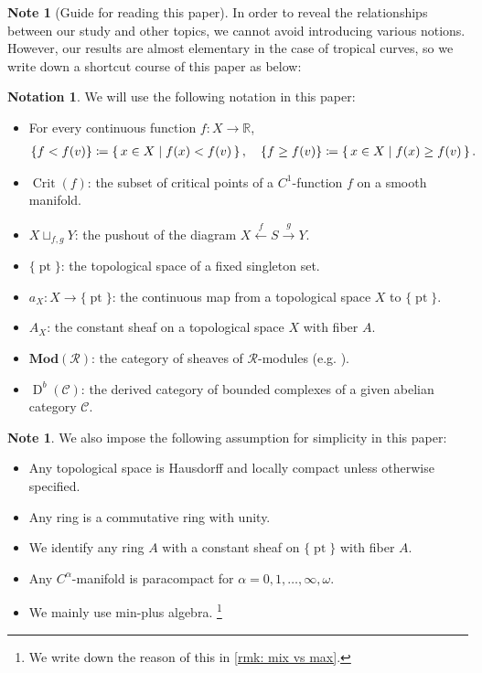 \documentclass[a4paper,dvipdfmx,reqno,12pt]{amsart}
\theoremstyle{definition}
\newtheorem{Note}[Thm]{Note}
\newtheorem{Not}[Thm]{Notation}
\newcommand{\deq}{\coloneqq}
\newcommand{\R}{\mathbb{R}}%
\newcommand{\opn}[1]{\operatorname{#1}}
\newcommand{\catn}[1]{\mathbf{#1}}
\newcommand{\xto}[1]{\xrightarrow{#1}}
\newcommand{\xgets}[1]{\xleftarrow{#1}}
\newcommand{\myfootnote}[1]{\hspace{-5pt}\footnote{#1}}
\numberwithin{equation}{section}
\begin{document}
\begin{Note}[Guide for reading this paper]
  In order to reveal the relationships between our study
  and other topics, we cannot avoid introducing various
  notions. However, our results are almost elementary
in the case of tropical curves,
  so we write down a shortcut course of this paper as below:
\end{Note}

\begin{Not}

We will use the following notation in this paper:

\begin{itemize}
\item For every continuous function $f\colon X\to \R$,
\begin{align*}
\{f<f(v)\}\deq \set{x\in X\mid f(x)< f(v)},\quad
\{f\geq f(v)\}\deq \set{x\in X\mid f(x)\geq f(v)}.
\end{align*}
\item $\opn{Crit}(f)$: the subset of critical points of
a $C^{1}$-function $f$ on a smooth manifold.
\item   $X\sqcup_{f,g}Y$: the pushout of the diagram
  $X\xgets{f} S\xto{g} Y$.
\item $\{\opn{pt}\}$: the topological space of 
a fixed singleton set.
\item $a_X\colon X\to \{\opn{pt}\}$:
the continuous map from a topological space $X$ to
$\{\opn{pt}\}$.
\item $A_X$: the constant sheaf on a topological space $X$ 
with fiber $A$.
\item $\catn{Mod}(\mathcal{R})$: the category of 
sheaves of $\mathcal{R}$-modules
(e.g. \cite[Definition 2.2.6]{MR1299726}).
\item $\opn{D}^{b}(\mathcal{C})$: the derived category
of bounded complexes of a given abelian category 
$\mathcal{C}$.
\end{itemize}

\end{Not}

\begin{Note}
We also impose the following assumption for simplicity in this paper:
\begin{itemize}
\item Any topological space is Hausdorff and
locally compact unless otherwise specified.
\item Any ring is a commutative ring with unity.
\item We identify any ring $A$ with a constant sheaf on
$\{\opn{pt}\}$ with fiber $A$.
\item Any $C^{\alpha}$-manifold is paracompact for 
$\alpha=0,1,\ldots,\infty,\omega$.
\item We mainly use min-plus algebra.
\myfootnote{We write down the reason of this in 
\cref{rmk: mix vs max}.}
\end{itemize}



\end{Note}
\end{document}

